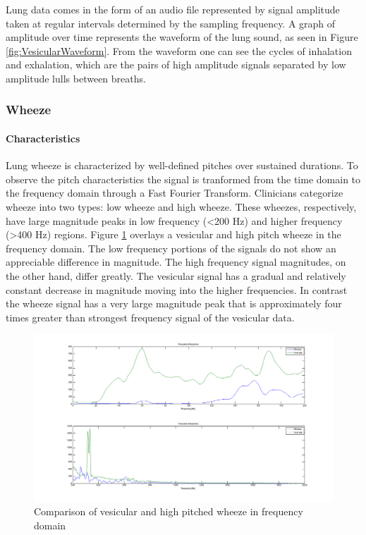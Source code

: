 \documentclass{article}
\begin{document}
Lung data comes in the form of an audio file represented by signal amplitude taken at regular intervals determined by the sampling frequency. A graph of amplitude over time represents the waveform of the lung sound, as seen in Figure \ref{fig:VesicularWaveform}. From the waveform one can see the cycles of inhalation and exhalation, which are the pairs of high amplitude signals separated by low amplitude lulls between breaths. \\

\subsubsection{Wheeze}

\paragraph{Characteristics}

Lung wheeze is characterized by well-defined pitches over sustained durations. To observe the pitch characteristics the signal is tranformed from the time domain to the frequency domain through a Fast Fourier Transform. Clinicians categorize wheeze into two types: low wheeze and high wheeze. These wheezes, respectively, have large magnitude peaks in low frequency (<200 Hz) and higher frequency (>400 Hz) regions. Figure \ref{fig:FFTVesicularWheeze} overlays a vesicular and high pitch wheeze in the frequency domain. The low frequency portions of the signals do not show an appreciable difference in magnitude. The high frequency signal magnitudes, on the other hand, differ greatly. The vesicular signal has a gradual and relatively constant decrease in magnitude moving into the higher frequencies. In contrast the wheeze signal has a very large magnitude peak that is approximately four times greater than strongest frequency signal of the vesicular data. \\

\begin{figure}[H]
	\includegraphics[width=\linewidth]{images/FFTVesicularWheeze.png}
	\caption{Comparison of vesicular and high pitched wheeze in frequency domain}
 	\label{fig:FFTVesicularWheeze}
\end{figure}
\end{document}
